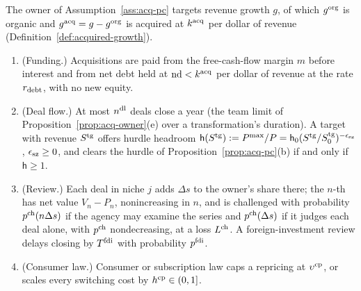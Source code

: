 \begin{assumption}[Limits]\label{ass:acq-limits}
The owner of Assumption~\ref{ass:acq-pc} targets revenue growth $g$, of which $g^{\rm org}$ is organic and $g^{\rm acq}=g-g^{\rm org}$ is acquired at $k^{\rm acq}$ per dollar of revenue (Definition~\ref{def:acquired-growth}).
\begin{enumerate}
\item[(i)] (Funding.) Acquisitions are paid from the free-cash-flow margin $m$ before interest and from net debt held at $\mathrm{nd}<k^{\rm acq}$ per dollar of revenue at the rate $r_{\rm debt}$, with no new equity.
\item[(ii)] (Deal flow.) At most $n^{\rm dl}$ deals close a year (the team limit of Proposition~\ref{prop:acq-owner}(e) over a transformation's duration). A target with revenue $S^{\rm tg}$ offers hurdle headroom $\mathsf h(S^{\rm tg}):=P^{\max}/P=\mathsf h_0(S^{\rm tg}/S^{\rm tg}_0)^{-\epsilon_{\rm sz}}$, $\epsilon_{\rm sz}\ge0$, and clears the hurdle of Proposition~\ref{prop:acq-pc}(b) if and only if $\mathsf h\ge1$.
\item[(iii)] (Review.) Each deal in niche $j$ adds $\Delta s$ to the owner's share there; the $n$-th has net value $V_n-P_n$, nonincreasing in $n$, and is challenged with probability $p^{\rm ch}(n\Delta s)$ if the agency may examine the series and $p^{\rm ch}(\Delta s)$ if it judges each deal alone, with $p^{\rm ch}$ nondecreasing, at a loss $L^{\rm ch}$. A foreign-investment review delays closing by $T^{\rm fdi}$ with probability $p^{\rm fdi}$.
\item[(iv)] (Consumer law.) Consumer or subscription law caps a repricing at $\upsilon^{\rm cp}$, or scales every switching cost by $h^{\rm cp}\in(0,1]$.
\end{enumerate}
\end{assumption}

